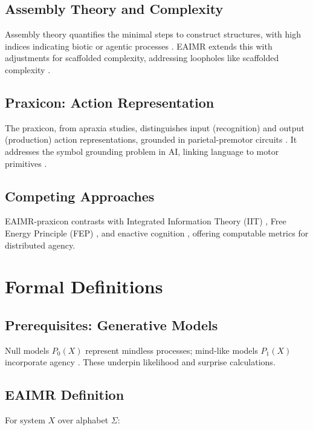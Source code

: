 \documentclass{article}
\begin{document}
\subsection{Assembly Theory and Complexity}
Assembly theory quantifies the minimal steps to construct structures, with high indices indicating biotic or agentic processes \citep{cronin2016beyond, walker2013algorithmic}. EAIMR extends this with adjustments for scaffolded complexity, addressing loopholes like scaffolded complexity \citep{adami2012use}.

\subsection{Praxicon: Action Representation}
The praxicon, from apraxia studies, distinguishes input (recognition) and output (production) action representations, grounded in parietal-premotor circuits \citep{peigneux2004imaging, mantovani2010reviewing}. It addresses the symbol grounding problem in AI, linking language to motor primitives \citep{harnad1990symbol, pastra2011praxicon, vannuscorps2023effector}.

\subsection{Competing Approaches}
EAIMR-praxicon contrasts with Integrated Information Theory (IIT) \citep{tononi2004information}, Free Energy Principle (FEP) \citep{friston2010free}, and enactive cognition \citep{barandiaran2009defining}, offering computable metrics for distributed agency.

\section{Formal Definitions}
\label{sec:formal}

\subsection{Prerequisites: Generative Models}
Null models \(P_0(X)\) represent mindless processes; mind-like models \(P_1(X)\) incorporate agency \citep{cover2006elements}. These underpin likelihood and surprise calculations.

\subsection{EAIMR Definition}
For system \(X\) over alphabet \(\Sigma\):
\end{document}
